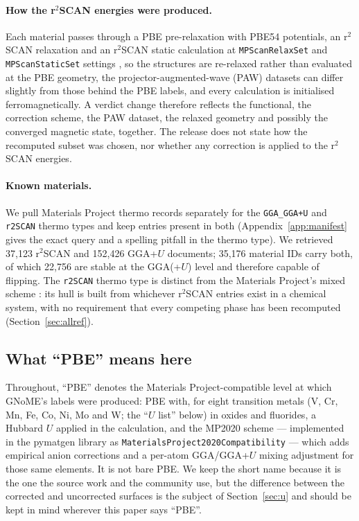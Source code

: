 \documentclass[11pt]{article}
\begin{document}
\paragraph{How the r$^2$SCAN energies were produced.} Each material passes through a
PBE pre-relaxation with PBE54 potentials, an r$^2$SCAN relaxation and an r$^2$SCAN
static calculation at \texttt{MPScanRelaxSet} and \texttt{MPScanStaticSet} settings
\citep{merchant2023}, so the structures are re-relaxed rather than evaluated at the PBE
geometry, the projector-augmented-wave (PAW) datasets can differ slightly from those behind the PBE labels, and
every calculation is initialised ferromagnetically. A verdict change therefore reflects
the functional, the correction scheme, the PAW dataset, the relaxed geometry and
possibly the converged magnetic state, together. The release does not state how the
recomputed subset was chosen, nor whether any correction is applied to the r$^2$SCAN
energies.

\paragraph{Known materials.} We pull Materials Project thermo records separately for the
\texttt{GGA\_GGA+U} and \texttt{r2SCAN} thermo types and keep entries present in both
(Appendix~\ref{app:manifest} gives the exact query and a spelling pitfall in the thermo
type). We retrieved 37{,}123 r$^2$SCAN and 152{,}426 GGA+$U$ documents; 35{,}176 material
IDs carry both, of which 22{,}756 are stable at the GGA(+$U$) level and therefore capable of
flipping. The \texttt{r2SCAN} thermo type is distinct from the Materials Project's mixed
scheme \citep{mpmixingdocs}: its hull is built from whichever r$^2$SCAN entries exist in
a chemical system, with no requirement that every competing phase has been recomputed
(Section~\ref{sec:allref}).

\subsection{What \texorpdfstring{``PBE''}{"PBE"} means here}

Throughout, ``PBE'' denotes the Materials Project-compatible level at which GNoME's
labels were produced: PBE with, for eight transition metals (V, Cr, Mn, Fe, Co, Ni, Mo
and W; the ``$U$ list'' below) in oxides and fluorides, a Hubbard $U$ applied in the
calculation, and the MP2020 scheme --- implemented in
the pymatgen library as \texttt{MaterialsProject2020Compatibility} --- which adds empirical anion
corrections and a per-atom GGA/GGA+$U$ mixing adjustment for those same elements. It is
not bare PBE. We keep the short name because it is the
one the source work and the community use, but the difference between the corrected and
uncorrected surfaces is the subject of Section~\ref{sec:u} and should be kept in mind
wherever this paper says ``PBE''.
\end{document}
